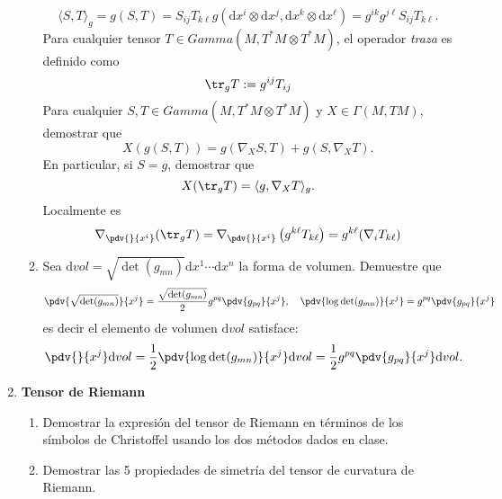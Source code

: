 \documentclass[../main]{subfiles}
\begin{document}
\begin{adjustwidth}{0pt}{-100pt}
\begin{enumerate}
\begin{enumerate}[label=(\alph*)]
        \begin{equation}
            \langle S, T \rangle_g = g(S, T)=S_{ij} T_{k\ell} g\left(\mathrm{d}x^{i}\otimes \mathrm{d}x^{j}, \mathrm{d}x^k\otimes \mathrm{d}x^{\ell}\right)=g^{ik}g^{j\ell} S_{ij}T_{k\ell}.
        \end{equation}
        Para cualquier tensor $T \in Gamma(M, T^* M\otimes T^* M)$, el operador \textit{traza} es definido como 
        \begin{equation}
            \tr_g T:=g^{ij}T_{ij}
        \end{equation}
        Para cualquier $S, T \in Gamma(M, T^* M \otimes T^* M)$ y $X \in \Gamma(M, TM)$, demostrar que 
        \begin{equation}
            X(g(S, T))=g(\nabla_X S, T)+g(S, \nabla_X T).
        \end{equation}
        En particular, si $S=g$, demostrar que 
        \begin{equation}
            X(\tr_g T)=\langle g, \nabla_X T\rangle_g.
        \end{equation}
        Localmente es 
        \begin{equation}
            \nabla_{\pdv{}{x^{i}}}(\tr_g T)=\nabla_{\pdv{}{x^{i}}}\left(g^{k\ell} T_{k\ell}\right)=g^{k\ell}(\nabla_i T_{k\ell})
        \end{equation}
        \item Sea $\mathrm{d}vol=\sqrt{\det (g_{mn})}\mathrm{d}x^1 \cdots \mathrm{d}x^n$ la forma de volumen. Demuestre que 
        \begin{equation}
            \pdv{\sqrt{\det(g_{mn})}}{x^{j}}=\dfrac{\sqrt{\det(g_{mn})}}{2}g^{pq} \pdv{g_{pq}}{x^{j}},\quad \pdv{\log \det (g_{mn})}{x^j}=g^{pq}\pdv{g_{pq}}{x^j}
        \end{equation}
        es decir el elemento de volumen $\mathrm{d}vol$ satisface: 
        \begin{equation}
            \pdv{}{x^j}\mathrm{d}vol=\dfrac{1}{2}\pdv{\log \det(g_{mn})}{x^j}\mathrm{d}vol=\dfrac{1}{2}g^{pq}\pdv{g_{pq}}{x^j}\mathrm{d}vol.
        \end{equation}
    \end{enumerate}
    \item \textbf{Tensor de Riemann}
    \begin{enumerate}[label=(\alph*)]
        \item Demostrar la expresión del tensor de Riemann en términos de los símbolos de Christoffel usando los dos métodos dados en clase.
        \item Demostrar las 5 propiedades de simetría del tensor de curvatura de Riemann.

\end{enumerate}
\end{enumerate}
\end{adjustwidth}
\end{document}

